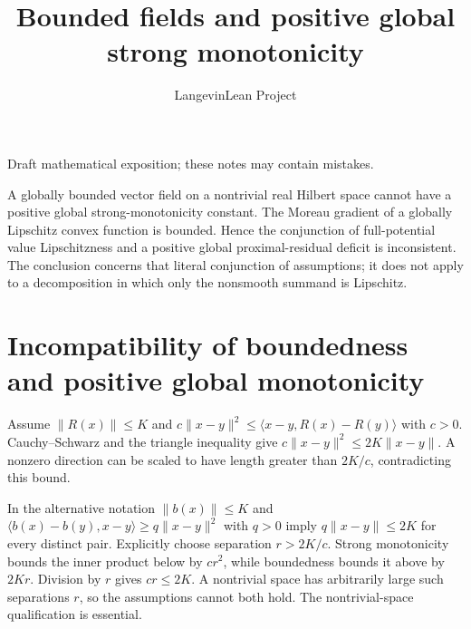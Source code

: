 \documentclass[11pt,a4paper]{article}
\title{\texorpdfstring{Bounded fields and positive global strong monotonicity}{Bounded fields and positive global strong monotonicity}}
\author{LangevinLean Project}
\date{}
\begin{document}
\maketitle
Draft mathematical exposition; these notes may contain mistakes.


A globally bounded vector field on a nontrivial real Hilbert space cannot have a positive global strong-monotonicity constant. The Moreau gradient of a globally Lipschitz convex function is bounded. Hence the conjunction of full-potential value Lipschitzness and a positive global proximal-residual deficit is inconsistent. The conclusion concerns that literal conjunction of assumptions; it does not apply to a decomposition in which only the nonsmooth summand is Lipschitz.


\section{\texorpdfstring{Incompatibility of boundedness and positive global monotonicity}{Incompatibility of boundedness and positive global monotonicity}}


Assume \(\|R(x)\|\le K\) and \(c\|x-y\|^2\le\langle x-y,R(x)-R(y)\rangle\) with \(c>0\). Cauchy–Schwarz and the triangle inequality give \(c\|x-y\|^2\le2K\|x-y\|\). A nonzero direction can be scaled to have length greater than \(2K/c\), contradicting this bound.



In the alternative notation \(\|b(x)\|\le K\) and \(\langle b(x)-b(y),x-y\rangle\ge q\|x-y\|^2\) with \(q>0\) imply \(q\|x-y\|\le2K\) for every distinct pair. Explicitly choose separation \(r>2K/c\). Strong monotonicity bounds the inner product below by \(cr^2\), while boundedness bounds it above by \(2Kr\). Division by \(r\) gives \(cr\le2K\). A nontrivial space has arbitrarily large such separations \(r\), so the assumptions cannot both hold. The nontrivial-space qualification is essential.
\end{document}
